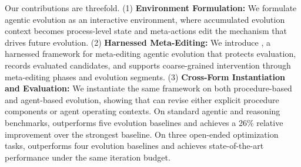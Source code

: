 Our contributions are threefold.
(1) \textbf{Environment Formulation:} We formulate agentic evolution as an interactive environment, where accumulated evolution context becomes process-level state and meta-actions edit the mechanism that drives future evolution.
(2) \textbf{Harnessed Meta-Editing:} We introduce \method, a harnessed framework for meta-editing agentic evolution that protects evaluation, records evaluated candidates, and supports coarse-grained intervention through meta-editing phases and evolution segments.
(3) \textbf{Cross-Form Instantiation and Evaluation:} We instantiate the same framework on both procedure-based and agent-based evolution, showing that \method can revise either explicit procedure components or agent operating contexts.
On standard agentic and reasoning benchmarks, \method outperforms five evolution baselines and achieves a 26\% relative improvement over the strongest baseline.
On three open-ended optimization tasks, \method outperforms four evolution baselines and achieves state-of-the-art performance under the same iteration budget.